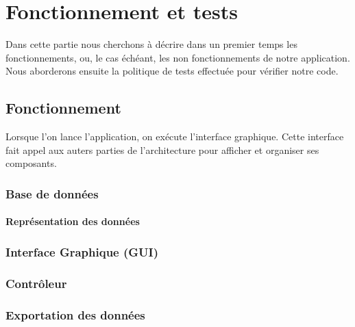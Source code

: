 \chapter{Fonctionnement et tests}

Dans cette partie nous cherchons à décrire dans un premier temps les fonctionnements, ou, le cas échéant, les non fonctionnements de notre application.  Nous aborderons ensuite la politique de tests effectuée pour vérifier notre code. 

\section{Fonctionnement}

Lorsque l'on lance l'application, on exécute l'interface graphique. Cette interface fait appel aux auters parties de l'architecture pour afficher et organiser ses composants.

\subsection{Base de données}

\subsubsection{Représentation des données}




\subsection{Interface Graphique (GUI)}
\lipsum[6]


\subsection{Contrôleur}
\lipsum[7]


\subsection{Exportation des données}
\lipsum[8]